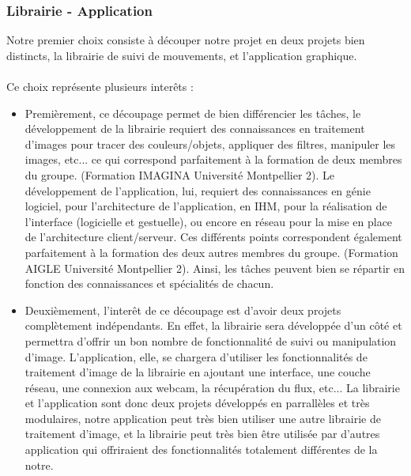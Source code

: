 \documentclass{article}
\begin{document}
			\subsubsection{Librairie - Application}
			Notre premier choix consiste à découper notre projet en deux projets bien distincts, la librairie de suivi de mouvements, et l'application graphique. \\ \\
			Ce choix représente plusieurs interêts : \\
			\begin{itemize}
				\item{Premièrement, ce découpage permet de bien différencier les tâches, le développement de la librairie requiert des connaissances en traitement d'images pour tracer des couleurs/objets, appliquer des filtres, manipuler les images, etc... ce qui correspond parfaitement à la formation de deux membres du groupe. (Formation IMAGINA Université Montpellier 2). Le développement de l'application, lui, requiert des connaissances en génie logiciel, pour l'architecture de l'application, en IHM, pour la réalisation de l'interface (logicielle et gestuelle), ou encore en réseau pour la mise en place de l'architecture client/serveur. Ces différents points correspondent également parfaitement à la formation des deux autres membres du groupe. (Formation AIGLE Université Montpellier 2). Ainsi, les tâches peuvent bien se répartir en fonction des connaissances et spécialités de chacun.} \\
				\item{Deuxièmement, l'interêt de ce découpage est d'avoir deux projets complètement indépendants. En effet, la librairie sera développée d'un côté et permettra d'offrir un bon nombre de fonctionnalité de suivi ou manipulation d'image. L'application, elle, se chargera d'utiliser les fonctionnalités de traitement d'image de la librairie en ajoutant une interface, une couche réseau, une connexion aux webcam, la récupération du flux, etc...
				La librairie et l'application sont donc deux projets développés en parrallèles et très modulaires, notre application peut très bien utiliser une autre librairie de traitement d'image, et la librairie peut très bien être utilisée par d'autres application qui offriraient des fonctionnalités totalement différentes de la notre.}
			\end{itemize}
\end{document}
